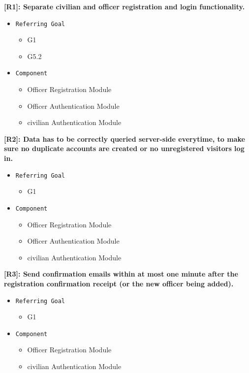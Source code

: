 \documentclass[12pt,a4paper]{article}
\begin{document}
\textbf{[R1]: Separate civilian and officer registration and login functionality.}
\begin{itemize}
	\item \texttt{Referring Goal}
	\begin{itemize}
		\item G1
		\item G5.2
	\end{itemize}
	\item \texttt{Component}
	\begin{itemize}
		\item Officer Registration Module 	\item Officer Authentication Module 	\item civilian Authentication Module
	\end{itemize}
\end{itemize}
\textbf{	[R2]: Data has to be correctly queried server-side everytime, to make sure no duplicate accounts are created or no unregistered visitors log in. }
\begin{itemize}
	\item \texttt{Referring Goal}
	\begin{itemize}
		\item G1
	\end{itemize}
	\item \texttt{Component}
	\begin{itemize}
		\item Officer Registration Module
		\item Officer Authentication Module
		\item civilian Authentication Module
	\end{itemize}
\end{itemize}
\textbf{[R3]: Send confirmation emails within at most one minute after the registration confirmation receipt (or the new officer being added). }
\begin{itemize}
	\item \texttt{Referring Goal}
	\begin{itemize}
		\item G1
	\end{itemize}
	\item \texttt{Component}
	\begin{itemize}
		\item Officer Registration Module 	\item civilian Authentication Module
	\end{itemize}
\end{itemize}
\end{document}
